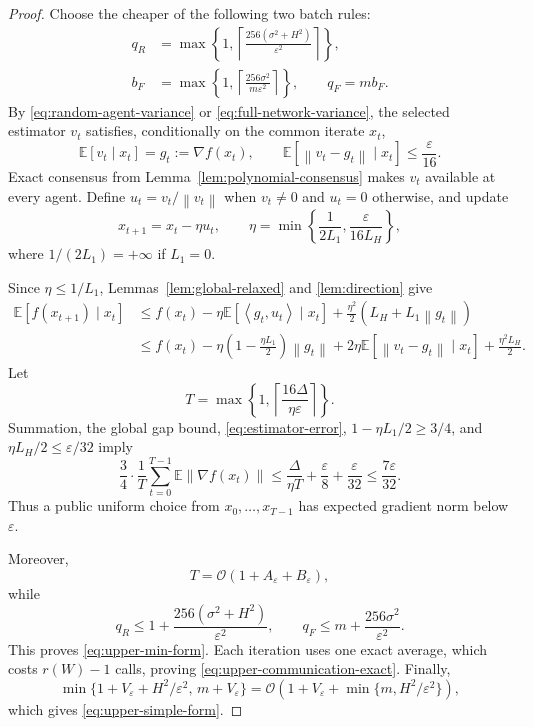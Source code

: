 \documentclass[11pt,a4paper]{article}
\newcommand{\E}{\mathbb{E}}
\newcommand{\eps}{\varepsilon}
\newcommand{\norm}[1]{\left\lVert #1\right\rVert}
\newcommand{\inner}[2]{\left\langle #1,#2\right\rangle}
\newcommand{\cO}{\mathcal{O}}
\theoremstyle{remark}
\begin{document}
\begin{proof}
Choose the cheaper of the following two batch rules:
\begin{align*}
 q_R&=\max\left\{1,
 \left\lceil\frac{256(\sigma^2+H^2)}{\eps^2}\right\rceil\right\},\\
 b_F&=\max\left\{1,
 \left\lceil\frac{256\sigma^2}{m\eps^2}\right\rceil\right\},
 \qquad q_F=mb_F.
\end{align*}
By \eqref{eq:random-agent-variance} or \eqref{eq:full-network-variance}, the
selected estimator $v_t$ satisfies, conditionally on the common iterate $x_t$,
\begin{equation}
 \E[v_t\mid x_t]=g_t:=\nabla f(x_t),
 \qquad
 \E[\norm{v_t-g_t}\mid x_t]\le\frac{\eps}{16}.
 \label{eq:estimator-error}
\end{equation}
Exact consensus from Lemma~\ref{lem:polynomial-consensus} makes $v_t$ available
at every agent.  Define $u_t=v_t/\norm{v_t}$ when $v_t\ne0$ and $u_t=0$
otherwise, and update
\begin{equation}
 x_{t+1}=x_t-\eta u_t,
 \qquad
 \eta=\min\left\{\frac1{2L_1},\frac{\eps}{16L_H}\right\},
 \label{eq:normalized-update}
\end{equation}
where $1/(2L_1)=+\infty$ if $L_1=0$.

Since $\eta\le1/L_1$, Lemmas~\ref{lem:global-relaxed} and
\ref{lem:direction} give
\[
\begin{aligned}
 \E[f(x_{t+1})\mid x_t]
 &\le f(x_t)
 -\eta\E[\inner{g_t}{u_t}\mid x_t]
 +\frac{\eta^2}{2}(L_H+L_1\norm{g_t})\\
 &\le f(x_t)
 -\eta\left(1-\frac{\eta L_1}{2}\right)\norm{g_t}
 +2\eta\E[\norm{v_t-g_t}\mid x_t]
 +\frac{\eta^2L_H}{2}.
\end{aligned}
\]
Let
\[
 T=\max\left\{1,
 \left\lceil\frac{16\Delta}{\eta\eps}\right\rceil\right\}.
\]
Summation, the global gap bound, \eqref{eq:estimator-error},
$1-\eta L_1/2\ge3/4$, and $\eta L_H/2\le\eps/32$ imply
\[
 \frac34\cdot\frac1T\sum_{t=0}^{T-1}
 \E\norm{\nabla f(x_t)}
 \le \frac{\Delta}{\eta T}+\frac{\eps}{8}+\frac{\eps}{32}
 \le\frac{7\eps}{32}.
\]
Thus a public uniform choice from $x_0,\ldots,x_{T-1}$ has expected gradient
norm below $\eps$.

Moreover,
\[
 T=\cO(1+A_\eps+B_\eps),
\]
while
\[
 q_R\le1+\frac{256(\sigma^2+H^2)}{\eps^2},
 \qquad
 q_F\le m+\frac{256\sigma^2}{\eps^2}.
\]
This proves \eqref{eq:upper-min-form}.  Each iteration uses one exact average,
which costs $r(W)-1$ calls, proving \eqref{eq:upper-communication-exact}.
Finally,
\[
 \min\{1+V_\eps+H^2/\eps^2,\,m+V_\eps\}
 =\cO\!\left(1+V_\eps+\min\{m,H^2/\eps^2\}\right),
\]
which gives \eqref{eq:upper-simple-form}.
\end{proof}
\end{document}
